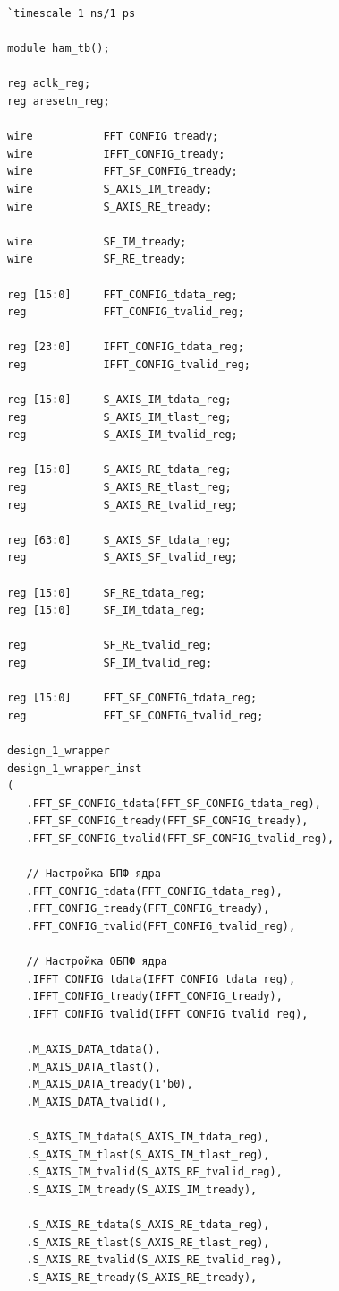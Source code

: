\begin{Verbatim}[tabsize=4]
`timescale 1 ns/1 ps

module ham_tb();

reg aclk_reg;
reg aresetn_reg;

wire           FFT_CONFIG_tready;
wire           IFFT_CONFIG_tready;
wire           FFT_SF_CONFIG_tready;
wire           S_AXIS_IM_tready;
wire           S_AXIS_RE_tready;

wire           SF_IM_tready;
wire           SF_RE_tready;

reg [15:0]     FFT_CONFIG_tdata_reg;
reg            FFT_CONFIG_tvalid_reg;

reg [23:0]     IFFT_CONFIG_tdata_reg;
reg            IFFT_CONFIG_tvalid_reg;

reg [15:0]     S_AXIS_IM_tdata_reg;
reg            S_AXIS_IM_tlast_reg;
reg            S_AXIS_IM_tvalid_reg;

reg [15:0]     S_AXIS_RE_tdata_reg;
reg            S_AXIS_RE_tlast_reg;
reg            S_AXIS_RE_tvalid_reg;

reg [63:0]     S_AXIS_SF_tdata_reg;
reg            S_AXIS_SF_tvalid_reg;

reg [15:0]     SF_RE_tdata_reg;
reg [15:0]     SF_IM_tdata_reg;

reg            SF_RE_tvalid_reg;
reg            SF_IM_tvalid_reg;

reg [15:0]     FFT_SF_CONFIG_tdata_reg;
reg            FFT_SF_CONFIG_tvalid_reg;

design_1_wrapper
design_1_wrapper_inst
(
   .FFT_SF_CONFIG_tdata(FFT_SF_CONFIG_tdata_reg),
   .FFT_SF_CONFIG_tready(FFT_SF_CONFIG_tready),
   .FFT_SF_CONFIG_tvalid(FFT_SF_CONFIG_tvalid_reg),

   // Настройка БПФ ядра  
   .FFT_CONFIG_tdata(FFT_CONFIG_tdata_reg),
   .FFT_CONFIG_tready(FFT_CONFIG_tready),
   .FFT_CONFIG_tvalid(FFT_CONFIG_tvalid_reg),

   // Настройка ОБПФ ядра
   .IFFT_CONFIG_tdata(IFFT_CONFIG_tdata_reg),
   .IFFT_CONFIG_tready(IFFT_CONFIG_tready),
   .IFFT_CONFIG_tvalid(IFFT_CONFIG_tvalid_reg),

   .M_AXIS_DATA_tdata(),
   .M_AXIS_DATA_tlast(),
   .M_AXIS_DATA_tready(1'b0),
   .M_AXIS_DATA_tvalid(),
   
   .S_AXIS_IM_tdata(S_AXIS_IM_tdata_reg),
   .S_AXIS_IM_tlast(S_AXIS_IM_tlast_reg),
   .S_AXIS_IM_tvalid(S_AXIS_RE_tvalid_reg),
   .S_AXIS_IM_tready(S_AXIS_IM_tready),
   
   .S_AXIS_RE_tdata(S_AXIS_RE_tdata_reg),
   .S_AXIS_RE_tlast(S_AXIS_RE_tlast_reg),
   .S_AXIS_RE_tvalid(S_AXIS_RE_tvalid_reg),
   .S_AXIS_RE_tready(S_AXIS_RE_tready),
    

\end{Verbatim}
